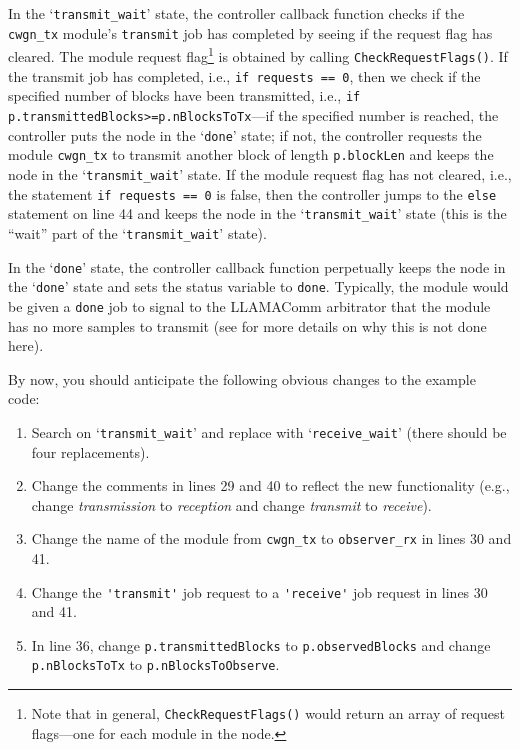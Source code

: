 In the `\verb+transmit_wait+' state, the controller callback function checks if the \verb+cwgn_tx+ module's \verb+transmit+ job has completed by seeing if the request flag has cleared.  The module request flag\footnote{Note that in general, {\tt CheckRequestFlags()} would return an array of request flags---one for each module in the node.} is obtained by calling \verb+CheckRequestFlags()+.  If the transmit job has completed, i.e., \verb+if requests == 0+, then we check if the specified number of blocks have been transmitted, i.e., \verb+if p.transmittedBlocks>=p.nBlocksToTx+---if the specified number is reached, the controller puts the node in the `\verb+done+' state; if not, the controller requests the module \verb+cwgn_tx+ to transmit another block of length \verb+p.blockLen+ and keeps the node in the `\verb+transmit_wait+' state.  If the module request flag has not cleared, i.e., the statement \verb+if requests == 0+ is false, then the controller jumps to the \verb+else+ statement on line 44 and keeps the node in the `\verb+transmit_wait+' state (this is the ``wait'' part of the `\verb+transmit_wait+' state).

In the `\verb+done+' state, the controller callback function perpetually keeps the node in the `\verb+done+' state and sets the status variable to \verb+done+.  Typically, the module would be given a \verb+done+ job to signal to the LLAMAComm arbitrator that the module has no more samples to transmit (see  for more details on why this is not done here).

By now, you should anticipate the following obvious changes to the example code:
\setcounter{enumitemp}{\theenumi}
\begin{enumerate}
\setcounter{enumi}{\theenumitemp}
\item Search on `\verb+transmit_wait+' and replace with `\verb+receive_wait+' (there should be four replacements).

\item Change the comments in lines 29 and 40 to reflect the new functionality (e.g., change \emph{transmission} to \emph{reception} and change \emph{transmit} to \emph{receive}).

\item Change the name of the module from \verb+cwgn_tx+ to \verb+observer_rx+ in lines 30 and 41.

\item Change the \verb+'transmit'+ job request to a \verb+'receive'+ job request in lines 30 and 41.

\item In line 36, change \verb+p.transmittedBlocks+ to \verb+p.observedBlocks+ and change \verb+p.nBlocksToTx+ to \verb+p.nBlocksToObserve+.

\end{enumerate}

